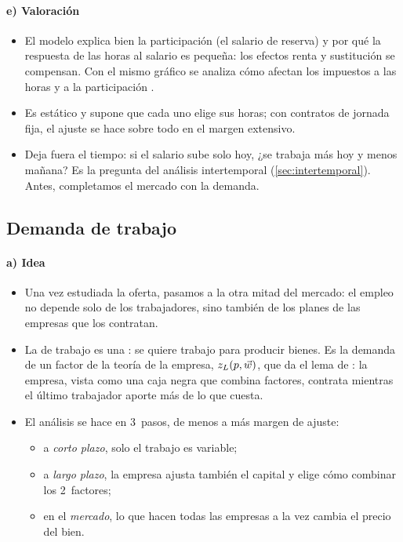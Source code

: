 \documentclass[11pt]{article}
\begin{document}
\paragraph{e) Valoración}\label{sec:oferta-valoracion}

\begin{itemize}
\item El modelo explica bien la participación (el salario de reserva) y por qué la respuesta de las horas al salario es pequeña: los efectos renta y sustitución se compensan. Con el mismo gráfico se analiza cómo afectan los impuestos a las horas y a la participación .
\item Es estático y supone que cada uno elige sus horas; con contratos de jornada fija, el ajuste se hace sobre todo en el margen extensivo.
\item Deja fuera el tiempo: si el salario sube solo hoy, ¿se trabaja más hoy y menos mañana? Es la pregunta del análisis intertemporal (\ref{sec:intertemporal}). Antes, completamos el mercado con la demanda.
\end{itemize}

\subsection{Demanda de trabajo}\label{sec:demanda}

\paragraph{a) Idea}

\begin{itemize}
\item Una vez estudiada la oferta, pasamos a la otra mitad del mercado: el empleo no depende solo de los trabajadores, sino también de los planes de las empresas que los contratan.
\item La de trabajo es una : se quiere trabajo para producir bienes\nocite{Hicks1932Theory}. Es la demanda de un factor de la teoría de la empresa, $z_L(p,\vec{w})$, que da el lema de  : la empresa, vista como una caja negra que combina factores, contrata mientras el último trabajador aporte más de lo que cuesta.
\item El análisis se hace en 3~pasos, de menos a más margen de ajuste:
  \begin{itemize}
  \item a \emph{corto plazo}, solo el trabajo es variable;
  \item a \emph{largo plazo}, la empresa ajusta también el capital y elige cómo combinar los 2~factores;
  \item en el \emph{mercado}, lo que hacen todas las empresas a la vez cambia el precio del bien.
  \end{itemize}
\end{itemize}
\end{document}
